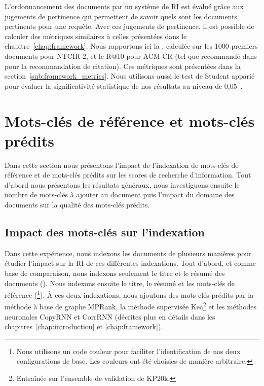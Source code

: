 L'ordonnancement des documents par un système de RI est évalué grâce aux jugements de pertinence qui permettent de savoir quels sont les documents pertinents pour une requête.
Avec ces jugements de pertinence, il est possible de calculer des métriques similaires à celles présentées dans le chapitre~\ref{chap:framework}.
Nous rapportons ici la \map{}, calculée sur les \num{1000} premiers documents pour NTCIR-2, et le R@10 pour ACM-CR (tel que recommandé dans \citet{farber_citation_2020} pour la recommandation de citation). Ces métriques sont présentées dans la section~\ref{sub:framework_metrics}.
Nous utilisons aussi le test de Student apparié pour évaluer la significativité statistique de nos résultats au niveau de 0,05~\cite{smucker_comparison_2007}.


\section{Mots-clés de référence et mots-clés prédits}

Dans cette section nous présentons l'impact de l'indexation de mots-clés de référence et de mots-clés prédits sur les scores de recherche d'information.
Tout d'abord nous présentons les résultats généraux, nous investiguons ensuite le nombre de mots-clés à ajouter au document puis l'impact du domaine des documents sur la qualité des mots-clés prédits.


\subsection{Impact des mots-clés sur l'indexation}
\label{sub:ri_impact_pred}

Dans cette expérience, nous indexons les documents de plusieurs manières pour étudier l'impact sur la RI de ces différentes indexations.
Tout d'abord, et comme base de comparaison, nous indexons seulement le titre et le résumé des documents (\tr{}).
Nous indexons ensuite le titre, le résumé et les mots-clés de référence (\trm{}\footnote{Nous utilisons un code couleur pour faciliter l'identification de nos deux configurations de base. Les couleurs ont été choisies de manière arbitraire.}).
\`A ces deux indexations, nous ajoutons des mots-clés prédits par la méthode à base de graphe MPRank, la méthode supervisée Kea\footnote{Entraînée sur l'ensemble de validation de KP20k.} et les méthodes neuronales CopyRNN et CorrRNN (décrites plus en détails dans les chapitres~\ref{chap:introduction} et \ref{chap:framework}).

